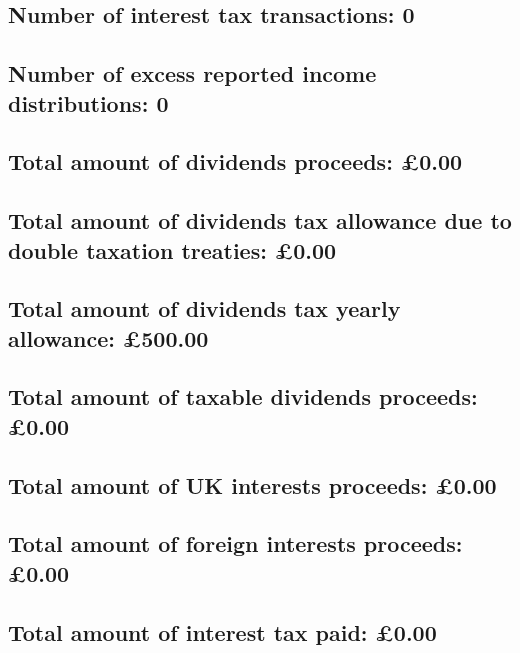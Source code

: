 \documentclass{article}
\begin{document}
\subsection*{Number of interest tax transactions: 0}
\subsection*{Number of excess reported income distributions: 0}
\subsection*{Total amount of dividends proceeds: £0.00}
\subsection*{Total amount of dividends tax allowance due to double taxation treaties: £0.00}
\subsection*{Total amount of dividends tax yearly allowance: £500.00}
\subsection*{Total amount of taxable dividends proceeds: £0.00}
\subsection*{Total amount of UK interests proceeds: £0.00}
\subsection*{Total amount of foreign interests proceeds: £0.00}
\subsection*{Total amount of interest tax paid: £0.00}
\end{document}
